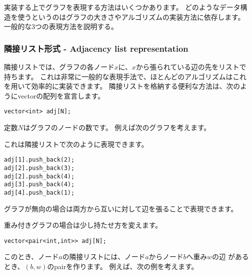 実装する上でグラフを表現する方法はいくつかあります。
どのようなデータ構造を使うというのはグラフの大きさやアルゴリズムの実装方法に依存します。
一般的な3つの表現方法を説明する。

\subsubsection{隣接リスト形式 - Adjacency list representation}


隣接リストでは、グラフの各ノード$x$に、$x$から張られている辺の先をリストで持ちます。
これは非常に一般的な表現手法で、ほとんどのアルゴリズムはこれを用いて効率的に実装できます。
隣接リストを格納する便利な方法は、次のようにvectorの配列を宣言します。
\begin{lstlisting}
vector<int> adj[N];
\end{lstlisting}
定数$N$はグラフのノードの数です。
例えば次のグラフを考えます。

\begin{center}
\end{center}
これは隣接リストで次のように表現できます。
\begin{lstlisting}
adj[1].push_back(2);
adj[2].push_back(3);
adj[2].push_back(4);
adj[3].push_back(4);
adj[4].push_back(1);
\end{lstlisting}

グラフが無向の場合は両方から互いに対して辺を張ることで表現できます。

重み付きグラフの場合は少し持たせ方を変えます。

\begin{lstlisting}
vector<pair<int,int>> adj[N];
\end{lstlisting}


このとき、ノード$a$の隣接リストには、ノード$a$からノード$b$へ重み$w$の辺
があるとき、$(b, w)$のpairを作ります。
例えば、次の例を考えます。

